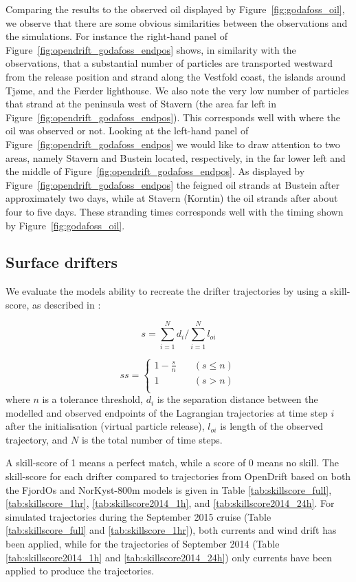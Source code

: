 Comparing the results to the observed oil displayed by Figure~\ref{fig:godafoss_oil}, we observe that there are some obvious similarities between the observations and the simulations. For instance the right-hand panel of Figure~\ref{fig:opendrift_godafoss_endpos} shows, in similarity with the observations, that a substantial number of particles are transported westward from the release position and strand along the Vestfold coast, the islands around Tj{\o}me, and the F{\ae}rder lighthouse. We also note the very low number of particles that strand at the peninsula west of Stavern (the area far left in Figure~\ref{fig:opendrift_godafoss_endpos}). This corresponds well with where the oil was observed or not. Looking at the left-hand panel of Figure~\ref{fig:opendrift_godafoss_endpos} we would like to draw attention to two areas, namely Stavern and Bustein located, respectively, in the far lower left and the middle of Figure~\ref{fig:opendrift_godafoss_endpos}. As displayed by Figure~\ref{fig:opendrift_godafoss_endpos} the feigned oil strands at Bustein after approximately two days, while at Stavern (Korntin) the oil strands after about four to five days. These stranding times corresponds well with the timing shown by Figure~\ref{fig:godafoss_oil}.

\subsection{Surface drifters}
\label{subsec:surfdr}
We evaluate the models ability to recreate the drifter trajectories by using a skill-score, as described in \cite{liu:2011}: 

$$s=\displaystyle\sum_{i=1}^{N} d_i / \displaystyle\sum_{i=1}^{N} l_{oi}$$

\[ ss = 
  \begin{cases}
    1 - \frac{s}{n}   & \quad (s \leq n)\\
    1                & \quad (s > n)   \\ 
  \end{cases}
\]
where $n$ is a tolerance threshold, $d_i$ is the separation distance between the modelled and observed endpoints of the Lagrangian trajectories at time step $i$ after the initialisation (virtual particle release), $l_{oi}$ is length of the observed trajectory, and $N$ is the total number of time steps.

A skill-score of 1 means a perfect match, while a score of 0 means no skill. %
The skill-score for each drifter compared to trajectories from OpenDrift based on both the FjordOs and NorKyst-800m models is given in Table \ref{tab:skillscore_full}, \ref{tab:skillscore_1hr}, \ref{tab:skillscore2014_1h}, and \ref{tab:skillscore2014_24h}. For simulated trajectories during the September 2015 cruise (Table \ref{tab:skillscore_full} and \ref{tab:skillscore_1hr}), both currents and wind drift has been applied, while for the trajectories of September 2014 (Table \ref{tab:skillscore2014_1h} and \ref{tab:skillscore2014_24h}) only currents have been applied to produce the trajectories.

